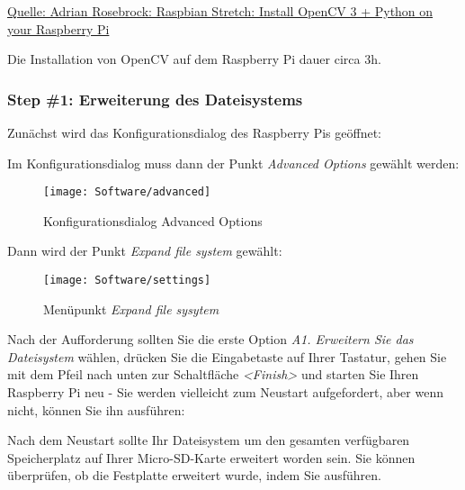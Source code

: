 \href{https://www.pyimagesearch.com/2017/09/04/raspbian-stretch-install-opencv-3-python-on-your-raspberry-pi/}{Quelle: Adrian Rosebrock: Raspbian Stretch: Install OpenCV 3 + Python on your Raspberry Pi \cite{Rosebrock:2017}}

\bigskip


Die Installation von OpenCV auf dem Raspberry Pi dauer circa 3h.


\subsubsection{Step \#1: Erweiterung des Dateisystems}


Zunächst wird das Konfigurationsdialog des Raspberry Pis geöffnet:

\medskip



\medskip

Im Konfigurationsdialog muss dann der Punkt \textsl{\glqq Advanced Options\grqq }
gewählt werden:

\begin{figure}[!h]
	\centering
	\texttt{[image: Software/advanced]} 
	\caption{Konfigurationsdialog \glqq Advanced Options\grqq }
	
\end{figure}


Dann wird der Punkt \textsl{\glqq Expand file system\grqq} gewählt:\\

\begin{figure}[!h]
	\centering
	\texttt{[image: Software/settings]} 
	\caption{Menüpunkt \textsl{\glqq Expand file sysytem\grqq}}
\end{figure}

Nach der Aufforderung sollten Sie die erste Option 
\textsl{\glqq A1. Erweitern Sie das Dateisystem\grqq} wählen, drücken Sie die Eingabetaste auf Ihrer Tastatur, gehen Sie mit dem Pfeil nach unten zur Schaltfläche 
\textsl{\glqq <Finish>\grqq} und starten Sie Ihren Raspberry Pi neu - Sie werden vielleicht zum Neustart aufgefordert, aber wenn nicht, können Sie ihn ausführen:

\medskip


\medskip

Nach dem Neustart sollte Ihr Dateisystem um den gesamten verfügbaren Speicherplatz auf Ihrer Micro-SD-Karte erweitert worden sein. Sie können überprüfen, ob die Festplatte erweitert wurde, indem Sie  ausführen.

